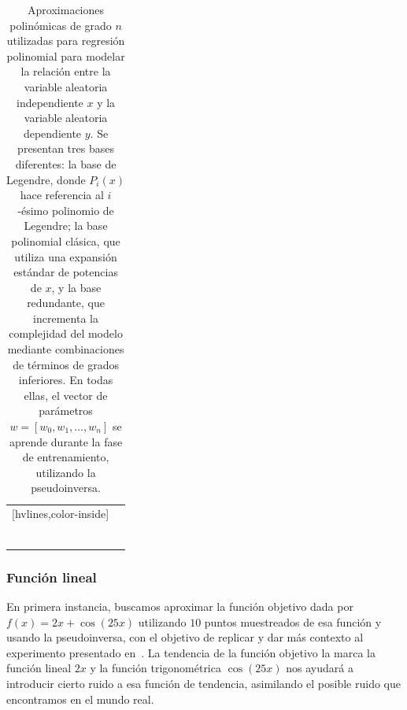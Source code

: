 \begin{table}[h]
    \centering
    \begin{NiceTabular}{c c}[hvlines,color-inside]
         &  \\ 
        
         &  \\ \\

         &   \\ \\

         &   \\ \\

    \end{NiceTabular}
    \caption[Aproximaciones polinómicas de grado $n$ utilizadas para regresión polinomial.]{Aproximaciones polinómicas de grado $n$ utilizadas para regresión polinomial para modelar la relación entre la variable aleatoria independiente $x$ y la variable aleatoria dependiente $y$. Se presentan tres bases diferentes: la base de Legendre, donde $P_i(x)$ hace referencia al $i$-ésimo polinomio de Legendre\footnotemark; la base polinomial clásica, que utiliza una expansión estándar de potencias de $x$, y la base redundante, que incrementa la complejidad del modelo mediante combinaciones de términos de grados inferiores. En todas ellas, el vector de parámetros $w = [w_0, w_1, \ldots, w_n]$ se aprende durante la fase de entrenamiento, utilizando la pseudoinversa.}\label{tabla:aproximaciones-polinomicas}
\end{table}

\subsubsection{Función lineal}\label{subsubsec:funcion-lineal}

En primera instancia, buscamos aproximar la función objetivo dada por $f(x) = 2x + \cos(25x)$ utilizando $10$ puntos muestreados de esa función y usando la pseudoinversa, con el objetivo de replicar y dar más contexto al experimento presentado en~\cite{Schaeffer2023}. La tendencia de la función objetivo la marca la función lineal $2x$ y la función trigonométrica $\cos(25x)$ nos ayudará a introducir cierto ruido a esa función de tendencia, asimilando el posible ruido que encontramos en el mundo real.

